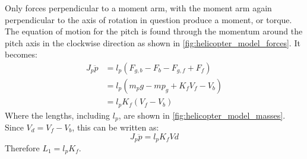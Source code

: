 %
Only forces perpendicular to a moment arm, with the moment arm again
perpendicular to the axis of rotation in question produce a moment, or
torque. The equation of motion for the pitch is found through the
momentum around the pitch axis in the clockwise direction as shown in
\cref{fig:helicopter_model_forces}. It becomes:
%
\begin{align*}
  J_p\ddot{p} &= l_p(F_{g,b} - F_b - F_{g,f} + F_f) \\
              &= l_p(m_pg - mp_g + K_fV_f - V_b) \\
              &= l_pK_f(V_f-V_b)
\end{align*}
%
Where the lengths, including $l_p$, are shown in
\cref{fig:helicopter_model_masses}. Since $V_d = V_f-V_b$, this can be written as:
%
\begin{equation}
  \label{eq:pitch EoM}
  J_p\ddot{p} = l_pK_fVd
\end{equation}
Therefore $L_1 = l_pK_f$.

